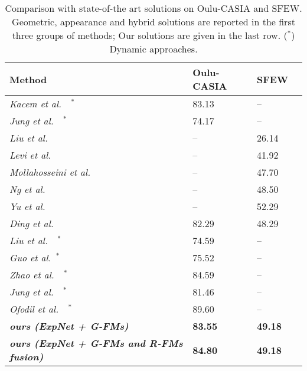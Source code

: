 \documentclass{bmvc2k}
\begin{document}
\begin{table}[!ht]
\begin{center}
\small
\begin{tabular}{llll}
\hline
\textbf{Method} & \textbf{Oulu-CASIA} & \textbf{SFEW} \\
\hline
\it Kacem et al.~\cite{kacem:2017}~$^*$ & 83.13 & --  \\
\it Jung et al.~\cite{jung2015joint}~$^*$ & 74.17 & -- \\
\hline
\it Liu et al.~\cite{liu2013aware} & -- & 26.14 \\
\it Levi et al.~\cite{levi2015emotion}& -- & 41.92 \\
\it Mollahosseini et al.~\cite{mollahosseini2016going} & -- & 47.70 \\
\it Ng et al.~\cite{ng2015deep} & -- & 48.50\\
\it Yu et al.~\cite{yu2015image} & --& 52.29\\
\it Ding et al.~\cite{ding2017facenet2expnet} & 82.29 & 48.29 \\
\it  Liu et al.~\cite{liu2014learning}~$^*$ & 74.59 & -- \\
\it Guo et al.\cite{guo2012dynamic}~$^*$ & 75.52 & -- \\
\it Zhao et al.~\cite{zhao2016peak}~$^*$  & 84.59 & -- \\
\hline
\it Jung et al.~\cite{jung2015joint}~$^*$ & 81.46 & -- \\
\it Ofodil et al.~\cite{ofodile2017automatic}~$^*$ & 89.60 & -- \\

\hline
\it \textbf{ours (ExpNet + G-FMs)} & \textbf{83.55} & \textbf{49.18} \\
\it \textbf{ours (ExpNet + G-FMs and R-FMs fusion)} & \textbf{84.80} &
\textbf{49.18} \\
\hline
\end{tabular}
\end{center}
\caption{Comparison with state-of-the art solutions on Oulu-CASIA and SFEW. Geometric, appearance and hybrid solutions are reported in the first three groups of methods; Our solutions are given in the last row. ($^*$) Dynamic approaches.}
\label{tab:ResultsComparisons}
\end{table}
\end{document}
